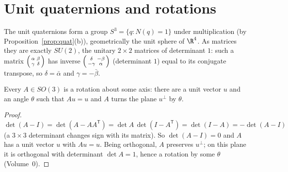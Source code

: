 \section{Unit quaternions and rotations}

The unit quaternions form a group $S^3=\{q:N(q)=1\}$ under multiplication (by Proposition~\ref{prop:quat}(b)), geometrically the unit sphere of $\R^4$. As matrices they are exactly $SU(2)$, the unitary $2\times2$ matrices of determinant $1$: such a matrix $\begin{psmallmatrix}\alpha&\beta\\\gamma&\delta\end{psmallmatrix}$ has inverse $\begin{psmallmatrix}\delta&-\beta\\-\gamma&\alpha\end{psmallmatrix}$ (determinant $1$) equal to its conjugate transpose, so $\delta=\bar\alpha$ and $\gamma=-\bar\beta$.

\begin{lemma}[Euler]\label{lem:euler}
Every $A\in SO(3)$ is a rotation about some axis: there are a unit vector $u$ and an angle $\theta$ such that $Au=u$ and $A$ turns the plane $u^\perp$ by $\theta$.
\end{lemma}
\begin{proof}
$\det(A-I)=\det(A-AA^{\mathsf T})=\det A\,\det(I-A^{\mathsf T})=\det(I-A)=-\det(A-I)$ (a $3\times3$ determinant changes sign with its matrix). So $\det(A-I)=0$ and $A$ has a unit vector $u$ with $Au=u$. Being orthogonal, $A$ preserves $u^\perp$; on this plane it is orthogonal with determinant $\det A=1$, hence a rotation by some $\theta$ (Volume~0).
\end{proof}

